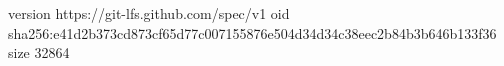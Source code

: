 version https://git-lfs.github.com/spec/v1
oid sha256:e41d2b373cd873cf65d77c007155876e504d34d34c38eec2b84b3b646b133f36
size 32864
